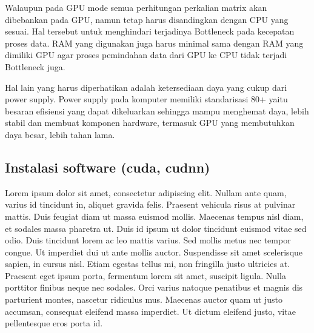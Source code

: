 \begin{table}[ht]
\caption{Spesifikasi Komputer untuk Deep Learning}
\centering
\label{table:spek_pc}
\end{table}

Walaupun pada GPU mode semua perhitungan perkalian matrix akan dibebankan pada GPU, namun tetap harus disandingkan dengan CPU yang sesuai. Hal tersebut untuk menghindari terjadinya Bottleneck pada kecepatan proses data. RAM yang digunakan juga harus minimal sama dengan RAM yang dimiliki GPU agar proses pemindahan data dari GPU ke CPU tidak terjadi Bottleneck juga.

Hal lain yang harus diperhatikan adalah ketersediaan daya yang cukup dari power supply. Power supply pada komputer memiliki standarisasi 80+ yaitu besaran efisiensi yang dapat dikeluarkan sehingga mampu menghemat daya, lebih stabil dan membuat komponen hardware, termasuk GPU yang membutuhkan daya besar, lebih tahan lama.

\subsection{ Instalasi software (cuda, cudnn)}

Lorem ipsum dolor sit amet, consectetur adipiscing elit. Nullam ante quam, varius id tincidunt in, aliquet gravida felis. Praesent vehicula risus at pulvinar mattis. Duis feugiat diam ut massa euismod mollis. Maecenas tempus nisl diam, et sodales massa pharetra ut. Duis id ipsum ut dolor tincidunt euismod vitae sed odio. Duis tincidunt lorem ac leo mattis varius. Sed mollis metus nec tempor congue. Ut imperdiet dui ut ante mollis auctor. Suspendisse sit amet scelerisque sapien, in cursus nisl. Etiam egestas tellus mi, non fringilla justo ultricies at. Praesent eget ipsum porta, fermentum lorem sit amet, suscipit ligula. Nulla porttitor finibus neque nec sodales. Orci varius natoque penatibus et magnis dis parturient montes, nascetur ridiculus mus. Maecenas auctor quam ut justo accumsan, consequat eleifend massa imperdiet. Ut dictum eleifend justo, vitae pellentesque eros porta id.

